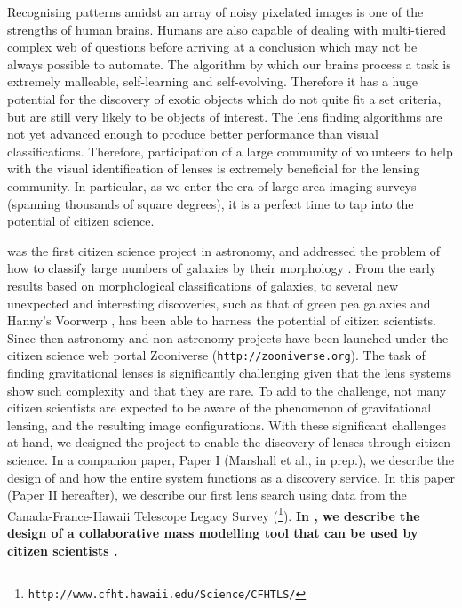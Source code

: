 \documentclass[useAMS,usenatbib,a4paper]{mn2e}
\begin{document}
Recognising patterns amidst an array of noisy pixelated images is one of the
strengths of human brains. Humans are also capable of dealing with
multi-tiered complex web of questions before arriving at a conclusion which may
not be always possible to automate. The algorithm by which our brains process a
task is extremely malleable, self-learning and self-evolving. Therefore it has
a huge potential for the discovery of exotic objects which do not quite fit a
set criteria, but are still very likely to be objects of interest. The lens
finding algorithms are not yet advanced enough to produce better performance
than visual classifications. Therefore, participation of a large community of
volunteers to help with the visual identification of lenses is extremely
beneficial for the lensing community. In particular, as we enter the era of
large area imaging surveys (spanning thousands of square degrees), it is
a perfect time to tap into the potential of citizen science.

\GZ was the first citizen science project in astronomy, and addressed
the problem of how to  classify large numbers of galaxies by their
morphology \citep{Lintott2008}.  From the early results based on
morphological classifications of galaxies, to several new unexpected and
interesting discoveries, such as that of green pea galaxies
\citep{Cardamone2009,Jaskot2013} and Hanny's Voorwerp
\citep{Lintott2009,Keel2012}, \GZ has been able to harness the potential
of citizen scientists.  Since then astronomy and non-astronomy projects
have been launched under the citizen science web portal Zooniverse
(\texttt{http://zooniverse.org}). The task of finding gravitational lenses is
significantly challenging given that the lens systems show such
complexity and that they are rare. To add to the challenge, not many
citizen scientists are expected to be aware of the phenomenon of
gravitational lensing, and the resulting image configurations.  With
these significant challenges at hand, we designed the \sw project to
enable the discovery of lenses through citizen science.  In a companion
paper, Paper I (Marshall et al., in prep.), we describe the design of
\sw and how the entire system functions as a discovery service.  In this
paper (Paper II hereafter), we describe our first lens search using data
from the Canada-France-Hawaii Telescope Legacy Survey
(\cfhtls\footnote{\texttt{http://www.cfht.hawaii.edu/Science/CFHTLS/}}).
{\bf In \citet{Kung2015}, we describe the design of a collaborative
mass modelling tool that can be used by citizen scientists
.}
\end{document}
